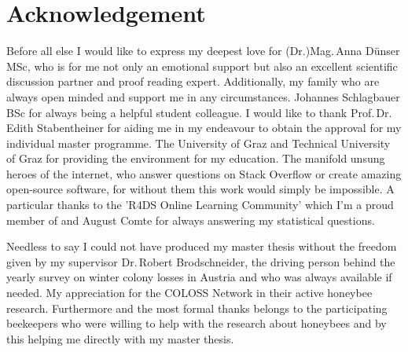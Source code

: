 \chapter*{Acknowledgement}
\label{sec:acknowledgement}
\vspace*{-10mm}

Before all else I would like to express my deepest love for (Dr.)Mag.\,Anna Dünser\,MSc, who is for me not only an emotional support but also an excellent scientific discussion partner and proof reading expert. Additionally, my family who are always open minded and support me in any circumstances. Johannes Schlagbauer\,BSc for always being a helpful student colleague. I would like to thank Prof.\,Dr.\,Edith Stabentheiner for aiding me in my endeavour to obtain the approval for my individual master programme. The University of Graz and Technical University of Graz for providing the environment for my education. The manifold unsung heroes of the internet, who answer questions on Stack Overflow or create amazing open-source software, for without them this work would simply be impossible. A particular thanks to the 'R4DS Online Learning Community' which I'm a proud member of and August Comte for always answering my statistical questions.

Needless to say I could not have produced my master thesis without the freedom given by my supervisor Dr.\,Robert Brodschneider, the driving person behind the yearly survey on winter colony losses in Austria and who was always available if needed. My appreciation for the COLOSS Network in their active honeybee research. Furthermore and the most formal thanks belongs to the participating beekeepers who were willing to help with the research about honeybees and by this helping me directly with my master thesis.